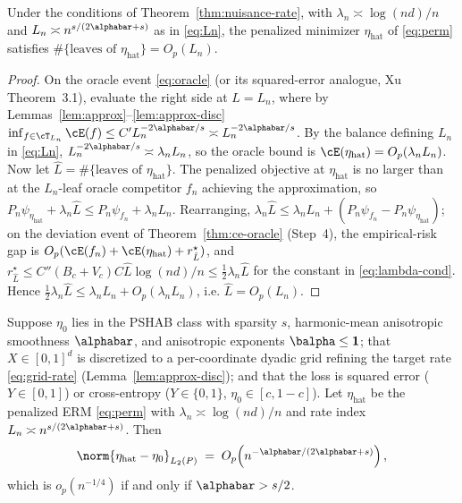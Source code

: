 \begin{lemma}\label{lem:hats}
Under the conditions of Theorem~\ref{thm:nuisance-rate}, with
$\lambda_n \asymp \log(nd)/n$ and $L_n \asymp n^{s/(2\alphabar + s)}$ as in
\eqref{eq:Ln}, the penalized minimizer $\eta_{\text{hat}}$ of \eqref{eq:perm}
satisfies $\#\{\text{leaves of }\eta_{\text{hat}}\} = O_p(L_n)$.
\end{lemma}

\begin{proof}
On the oracle event \eqref{eq:oracle} (or its squared-error analogue, Xu
Theorem~3.1), evaluate the right side at $L = L_n$, where by
Lemmas~\ref{lem:approx}--\ref{lem:approx-disc}
$\inf_{f\in\cT_{L_n}}\cE(f) \le C' L_n^{-2\alphabar/s} \asymp
L_n^{-2\alphabar/s}$. By the balance defining $L_n$ in \eqref{eq:Ln},
$L_n^{-2\alphabar/s} \asymp \lambda_n L_n$, so the oracle bound is
$\cE(\eta_{\text{hat}}) = O_p(\lambda_n L_n)$. Now let
$\hat L = \#\{\text{leaves of }\eta_{\text{hat}}\}$. The penalized objective at
$\eta_{\text{hat}}$ is no larger than at the $L_n$-leaf oracle competitor $f_n$
achieving the approximation, so
$P_n \psi_{\eta_{\text{hat}}} + \lambda_n \hat L \le P_n \psi_{f_n} +
\lambda_n L_n$. Rearranging, $\lambda_n \hat L \le \lambda_n L_n +
(P_n\psi_{f_n} - P_n\psi_{\eta_{\text{hat}}})$; on the deviation event of
Theorem~\ref{thm:ce-oracle} (Step~4), the empirical-risk gap is
$O_p(\cE(f_n) + \cE(\eta_{\text{hat}}) + r^\star_{\hat L})$, and
$r^\star_{\hat L} \le C''(B_c+V_c) C \hat L \log(nd)/n \le \tfrac12 \lambda_n
\hat L$ for the constant in \eqref{eq:lambda-cond}. Hence
$\tfrac12 \lambda_n \hat L \le \lambda_n L_n + O_p(\lambda_n L_n)$, i.e.
$\hat L = O_p(L_n)$.
\end{proof}


\begin{theorem}\label{thm:nuisance-rate}
Suppose $\eta_0$ lies in the PSHAB class with sparsity $s$, harmonic-mean
anisotropic smoothness $\alphabar$, and anisotropic exponents $\balpha \le
\mathbf 1$; that $X \in [0,1]^d$ is discretized to a per-coordinate dyadic grid
refining the target rate \eqref{eq:grid-rate} (Lemma~\ref{lem:approx-disc}); and
that the loss is squared error ($Y \in [0,1]$) or cross-entropy
($Y \in \{0,1\}$, $\eta_0 \in [c,1-c]$). Let $\eta_{\text{hat}}$ be the
penalized ERM \eqref{eq:perm} with $\lambda_n \asymp \log(nd)/n$ and rate index
$L_n \asymp n^{s/(2\alphabar+s)}$. Then
\begin{equation}\label{eq:nuisance-rate}
  \norm{\eta_{\text{hat}} - \eta_0}_{L_2(P)}
  \;=\; O_p\!\left( n^{-\alphabar/(2\alphabar + s)} \right),
\end{equation}
which is $o_p(n^{-1/4})$ if and only if $\alphabar > s/2$.
\end{theorem}

